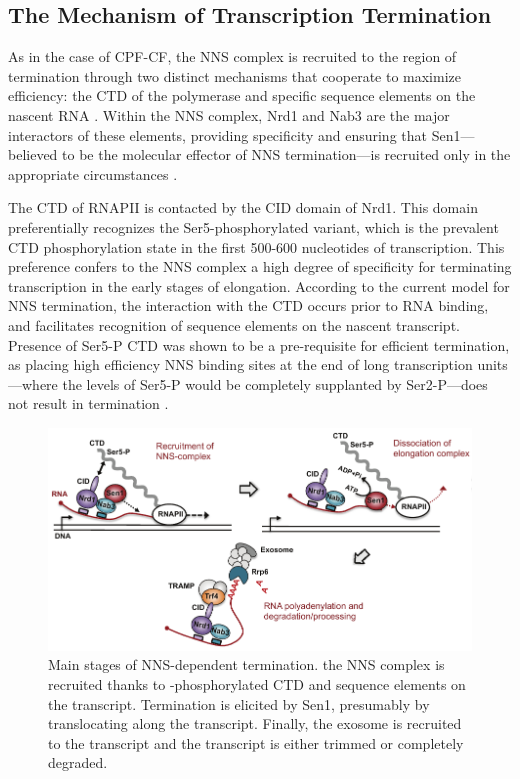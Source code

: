 \subsection{The Mechanism of Transcription Termination}

As in the case of CPF-CF, the NNS complex is recruited to the region of termination through two distinct mechanisms that cooperate to maximize efficiency: the CTD of the polymerase \cite{vasiljeva:2008:nrd1nab3sen1} and specific sequence elements on the nascent RNA \cite{conrad:2000:yeast}. 
Within the NNS complex, Nrd1 and Nab3 are the major interactors of these elements, providing specificity and ensuring that Sen1---believed to be the molecular effector of NNS termination---is recruited only in the appropriate circumstances \cite{porrua:2013:bacteriallike}.

The CTD of RNAPII is contacted by the CID domain of Nrd1. 
This domain preferentially recognizes the Ser5-phosphorylated variant, which is the prevalent CTD phosphorylation state in the first 500-600 nucleotides of transcription. 
This preference confers to the NNS complex a high degree of specificity for terminating transcription in the early stages of elongation. 
According to the current model for NNS termination, the interaction with the CTD occurs prior to RNA binding, and facilitates recognition of sequence elements on the nascent transcript.  
Presence of Ser5-P CTD was shown to be a pre-requisite for efficient termination, as placing high efficiency NNS binding sites at the end of long transcription units---where the levels of Ser5-P would be completely supplanted by Ser2-P---does not result in termination \cite{gudipati:2008:phosphorylation}.

\begin{figure}[ht]

\centering
\includegraphics[width=\textwidth]{figures/introduction/nns}
\caption[Mechanism of NNS termination]{Main stages of NNS-dependent termination. the NNS complex is recruited thanks to \serf{}-phosphorylated CTD and sequence elements on the transcript. Termination is elicited by Sen1, presumably by translocating along the transcript. Finally, the exosome is recruited to the transcript and the transcript is either trimmed or completely degraded.}
\label{fig:nnsTermination}

\end{figure}

